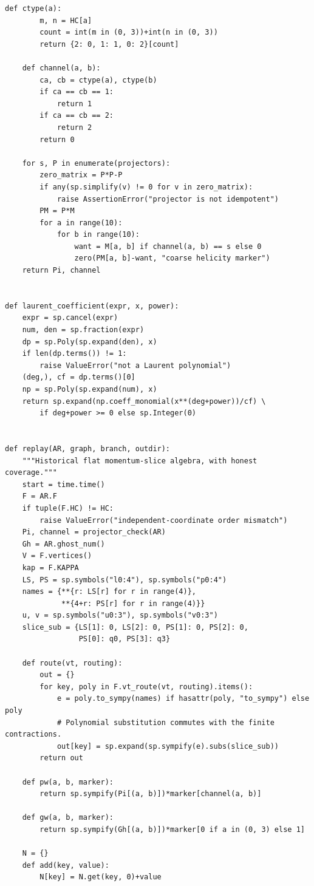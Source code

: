 \documentclass[11pt,a4paper]{article}
\theoremstyle{plain}
\theoremstyle{definition}
\theoremstyle{remark}
\numberwithin{equation}{section}
\begin{document}
\begin{lstlisting}[caption={Consolidated exact checker and coverage-aware optional replay.},
                  label={lst:program}]
    def ctype(a):
        m, n = HC[a]
        count = int(m in (0, 3))+int(n in (0, 3))
        return {2: 0, 1: 1, 0: 2}[count]

    def channel(a, b):
        ca, cb = ctype(a), ctype(b)
        if ca == cb == 1:
            return 1
        if ca == cb == 2:
            return 2
        return 0

    for s, P in enumerate(projectors):
        zero_matrix = P*P-P
        if any(sp.simplify(v) != 0 for v in zero_matrix):
            raise AssertionError("projector is not idempotent")
        PM = P*M
        for a in range(10):
            for b in range(10):
                want = M[a, b] if channel(a, b) == s else 0
                zero(PM[a, b]-want, "coarse helicity marker")
    return Pi, channel


def laurent_coefficient(expr, x, power):
    expr = sp.cancel(expr)
    num, den = sp.fraction(expr)
    dp = sp.Poly(sp.expand(den), x)
    if len(dp.terms()) != 1:
        raise ValueError("not a Laurent polynomial")
    (deg,), cf = dp.terms()[0]
    np = sp.Poly(sp.expand(num), x)
    return sp.expand(np.coeff_monomial(x**(deg+power))/cf) \
        if deg+power >= 0 else sp.Integer(0)


def replay(AR, graph, branch, outdir):
    """Historical flat momentum-slice algebra, with honest coverage."""
    start = time.time()
    F = AR.F
    if tuple(F.HC) != HC:
        raise ValueError("independent-coordinate order mismatch")
    Pi, channel = projector_check(AR)
    Gh = AR.ghost_num()
    V = F.vertices()
    kap = F.KAPPA
    LS, PS = sp.symbols("l0:4"), sp.symbols("p0:4")
    names = {**{r: LS[r] for r in range(4)},
             **{4+r: PS[r] for r in range(4)}}
    u, v = sp.symbols("u0:3"), sp.symbols("v0:3")
    slice_sub = {LS[1]: 0, LS[2]: 0, PS[1]: 0, PS[2]: 0,
                 PS[0]: q0, PS[3]: q3}

    def route(vt, routing):
        out = {}
        for key, poly in F.vt_route(vt, routing).items():
            e = poly.to_sympy(names) if hasattr(poly, "to_sympy") else poly
            # Polynomial substitution commutes with the finite contractions.
            out[key] = sp.expand(sp.sympify(e).subs(slice_sub))
        return out

    def pw(a, b, marker):
        return sp.sympify(Pi[(a, b)])*marker[channel(a, b)]

    def gw(a, b, marker):
        return sp.sympify(Gh[(a, b)])*marker[0 if a in (0, 3) else 1]

    N = {}
    def add(key, value):
        N[key] = N.get(key, 0)+value


\end{lstlisting}
\end{document}
